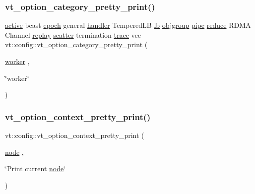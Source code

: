 \subsubsection{\texorpdfstring{vt\+\_\+option\+\_\+category\+\_\+pretty\+\_\+print()}{vt\_option\_category\_pretty\_print()}\hspace{0.1cm}{\footnotesize\ttfamily [17/17]}}
{\footnotesize\ttfamily \hyperlink{namespacevt_1_1config_a6bd1d6215bda0d8ca02811798399f689a82f77c67af0c363709010c6df4dbd920}{active} bcast \hyperlink{namespacevt_1_1config_a6bd1d6215bda0d8ca02811798399f689a05bdb92281360bcbfdf239ad3ccbde19}{epoch} general \hyperlink{namespacevt_1_1config_a6bd1d6215bda0d8ca02811798399f689a82a0081a94d5c5dfd18b0b3f7eca64b7}{handler} Tempered\+LB \hyperlink{namespacevt_1_1config_a6bd1d6215bda0d8ca02811798399f689aecb25779c74e06cc3e6baf03ed8289ed}{lb} \hyperlink{namespacevt_1_1config_a6bd1d6215bda0d8ca02811798399f689a338198b4d813c2e8d709e0015fc40d45}{objgroup} \hyperlink{namespacevt_1_1config_a6bd1d6215bda0d8ca02811798399f689ad2f6c4149417910966357969e4740fbd}{pipe} \hyperlink{namespacevt_1_1config_a6bd1d6215bda0d8ca02811798399f689af558c370706b5e7bd8ba5224657ca9b4}{reduce} R\+D\+MA Channel \hyperlink{namespacevt_1_1config_a6bd1d6215bda0d8ca02811798399f689a308de223841fffddff9f71e1649956cf}{replay} \hyperlink{namespacevt_1_1config_a6bd1d6215bda0d8ca02811798399f689ab0821d060501c20d94b8d700df7fdd76}{scatter} termination \hyperlink{namespacevt_1_1config_a6bd1d6215bda0d8ca02811798399f689aa14cb3132cde2e74239755b4c3944f43}{trace} vcc vt\+::config\+::vt\+\_\+option\+\_\+category\+\_\+pretty\+\_\+print (\begin{DoxyParamCaption}\item[{\hyperlink{namespacevt_1_1config_a6bd1d6215bda0d8ca02811798399f689a24771d4179e70d6e207872dbca07e2ef}{worker}}]{,  }\item[{\char`\"{}worker\char`\"{}}]{ }\end{DoxyParamCaption})}

\mbox{\label{namespacevt_1_1config_a7318827247b6fe5313529e7c8b2a9a28}} 
\subsubsection{\texorpdfstring{vt\+\_\+option\+\_\+context\+\_\+pretty\+\_\+print()}{vt\_option\_context\_pretty\_print()}}
{\footnotesize\ttfamily vt\+::config\+::vt\+\_\+option\+\_\+context\+\_\+pretty\+\_\+print (\begin{DoxyParamCaption}\item[{\hyperlink{namespacevt_1_1config_a46e57c33bee1b9f1fa95455af86d80e0a576033c81e2ddd03d721ecef3b1b3f81}{node}}]{,  }\item[{\char`\"{}Print current \hyperlink{namespacevt_1_1config_a46e57c33bee1b9f1fa95455af86d80e0a576033c81e2ddd03d721ecef3b1b3f81}{node}\char`\"{}}]{ }\end{DoxyParamCaption})}

